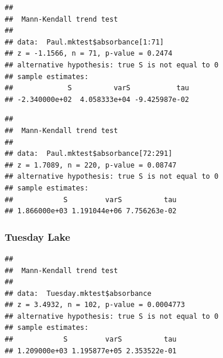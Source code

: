\documentclass[12pt,]{article}
\newenvironment{Shaded}{\begin{snugshade}}{\end{snugshade}}
\newcommand{\KeywordTok}[1]{\textcolor[rgb]{0.13,0.29,0.53}{\textbf{#1}}}
\newcommand{\DecValTok}[1]{\textcolor[rgb]{0.00,0.00,0.81}{#1}}
\newcommand{\StringTok}[1]{\textcolor[rgb]{0.31,0.60,0.02}{#1}}
\newcommand{\CommentTok}[1]{\textcolor[rgb]{0.56,0.35,0.01}{\textit{#1}}}
\newcommand{\OperatorTok}[1]{\textcolor[rgb]{0.81,0.36,0.00}{\textbf{#1}}}
\newcommand{\NormalTok}[1]{#1}
\begin{document}
\begin{verbatim}
## 
##  Mann-Kendall trend test
## 
## data:  Paul.mktest$absorbance[1:71]
## z = -1.1566, n = 71, p-value = 0.2474
## alternative hypothesis: true S is not equal to 0
## sample estimates:
##             S          varS           tau 
## -2.340000e+02  4.058333e+04 -9.425987e-02
\end{verbatim}

\begin{Shaded}
\end{Shaded}

\begin{verbatim}
## 
##  Mann-Kendall trend test
## 
## data:  Paul.mktest$absorbance[72:291]
## z = 1.7089, n = 220, p-value = 0.08747
## alternative hypothesis: true S is not equal to 0
## sample estimates:
##            S         varS          tau 
## 1.866000e+03 1.191044e+06 7.756263e-02
\end{verbatim}

\subsubsection{Tuesday Lake}\label{tuesday-lake}

\begin{Shaded}
\end{Shaded}

\begin{verbatim}
## 
##  Mann-Kendall trend test
## 
## data:  Tuesday.mktest$absorbance
## z = 3.4932, n = 102, p-value = 0.0004773
## alternative hypothesis: true S is not equal to 0
## sample estimates:
##            S         varS          tau 
## 1.209000e+03 1.195877e+05 2.353522e-01
\end{verbatim}
\end{document}
